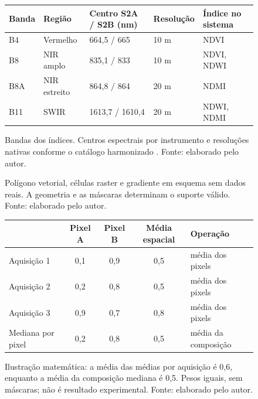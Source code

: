 \begin{figure}[htbp]
\centering\small
\begin{tabular}{lllll}
\hline Banda & Região & Centro S2A / S2B (nm) & Resolução & Índice no sistema\\ \hline
B4 & Vermelho & 664,5 / 665 & 10 m & NDVI\\
B8 & NIR amplo & 835,1 / 833 & 10 m & NDVI, NDWI\\
B8A & NIR estreito & 864,8 / 864 & 20 m & NDMI\\
B11 & SWIR & 1613,7 / 1610,4 & 20 m & NDWI, NDMI\\ \hline
\end{tabular}

\caption{Bandas dos índices. Centros espectrais por instrumento e resoluções nativas conforme o catálogo harmonizado \citep{GOOGLE_S2_SR}. Fonte: elaborado pelo autor.}
\label{fig:bandas}
\end{figure}
\begin{figure}[htbp]
\centering
{}
\caption{Polígono vetorial, células raster e gradiente em esquema sem dados reais. A geometria e as máscaras determinam o suporte válido. Fonte: elaborado pelo autor.}
\label{fig:raster-vetor}
\end{figure}
\begin{figure}[htbp]
\centering\small
\begin{tabular}{lcccl}
\hline & Pixel A & Pixel B & Média espacial & Operação\\ \hline
Aquisição 1 & 0,1 & 0,9 & 0,5 & média dos pixels\\
Aquisição 2 & 0,2 & 0,8 & 0,5 & média dos pixels\\
Aquisição 3 & 0,9 & 0,7 & 0,8 & média dos pixels\\ \hline
Mediana por pixel & 0,2 & 0,8 & 0,5 & média da composição\\ \hline
\end{tabular}
\caption{Ilustração matemática: a média das médias por aquisição é 0,6, enquanto a média da composição mediana é 0,5. Pesos iguais, sem máscaras; não é resultado experimental. Fonte: elaborado pelo autor.}
\label{fig:composicao}
\end{figure}
